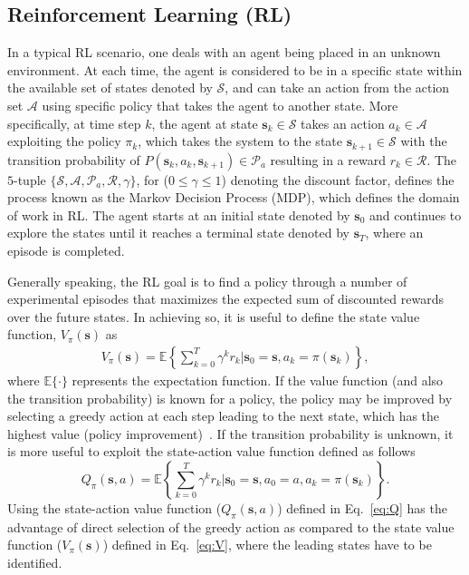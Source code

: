 \documentclass{ieeeaccess}
\def\mS{\mathcal{S}}
\def\mA{\mathcal{A}}
\def\mP{\mathcal{P}}
\def\mR{\mathcal{R}}
\def\ua{_{a}}
\def\k{_{k}}
\def\s{\bm{s}}
\begin{document}
\subsection{Reinforcement Learning (RL)}
In a typical RL scenario, one deals with an agent being placed in an unknown environment. At each time, the agent is considered to be in a specific state  within the available set of states denoted by $\mS$, and can take an action from the action set $\mA$ using specific policy that takes the agent to another state.
%
More specifically, at time step $k$, the agent at state $\s_k \in \mS$ takes an action $a_k \in \mA$ exploiting the policy $\pi_k$, which takes the system to the state $\s_{k+1} \in\mS$ with the transition probability of $P(\s_k, a_k, \s_{k+1}) \in \mP\ua$ resulting in a reward $r_k \in \mR$. The $5$-tuple $\{\mS, \mA, \mP\ua, \mR, \gamma\}$, for ($0 \leq \gamma \leq 1$) denoting the discount factor, defines the process known as the Markov Decision Process (MDP), which defines the domain of work in RL. The agent starts at an initial state denoted by $\s_0$ and continues to explore the states until it reaches a terminal state denoted by $\s_T$, where an episode is completed.

Generally speaking, the RL goal is to find a policy through a number of experimental episodes that maximizes the expected sum of discounted rewards over the future states. In achieving so, it is useful to define the state value function, $V_{\pi}(\s)$ as
%
\begin{eqnarray}
V_{\pi}(\s) = \mathbb{E} \left\{\sum_{k=0}^{T}\gamma^k r\k |\s_0=\s, a\k = \pi(\s\k) \right\},\label{eq:V}
\end{eqnarray}
%
where $\mathbb{E}\{\cdot\}$ represents the expectation function. If the value function (and also the transition probability) is known for a policy, the policy may be improved by selecting a greedy action at each step leading to the next state, which has the highest value (policy improvement)~\cite{30}. If the transition probability is unknown, it is more useful to exploit the state-action value function defined as follows
%
\begin{equation}
Q_{\pi}(\s, a) = \mathbb{E} \left\{\sum_{k=0}^{T}\gamma^k r\k |\s_0=\s, a_0 = a, a\k = \pi(\s\k) \right\}.\label{eq:Q}
\end{equation}
%
Using the state-action value function ($Q_{\pi}(\s, a)$) defined in Eq.~\eqref{eq:Q} has the advantage of direct selection of the greedy action as compared to the state value function ($V_{\pi}(\s)$) defined in Eq.~\eqref{eq:V}, where the leading states have to be identified.
\end{document}
